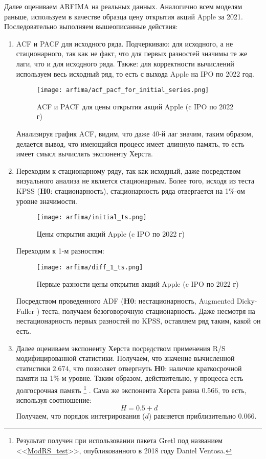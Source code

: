 \noindent Далее оцениваем ARFIMA на реальных данных. Аналогично всем моделям раньше, используем в качестве образца цену открытия акций Apple за 2021. Последовательно выполняем вышеописанные действия:
\begin{enumerate}
	\item ACF и PACF для исходного ряда. Подчеркиваю: для исходного, а не стационарного, так как не факт, что для первых разностей значимы те же лаги, что и для исходного ряда. Также: для корректности вычислений используем весь исходный ряд, то есть с выхода Apple на IPO по 2022 год.
	\begin{figure}[H]
		\centering
		\texttt{[image: arfima/acf\_pacf\_for\_initial\_series.png]}
		\caption{ACF и PACF для цены открытия акций Apple (c IPO по 2022 г)}
	\end{figure}
	Анализируя график ACF, видим, что даже 40-й лаг значим, таким образом, делается вывод, что имеющийся процесс имеет длинную память, то есть имеет смысл вычислять экспоненту Херста.
	
	\item Переходим к стационарному ряду, так как исходный, даже посредством визуального анализа не является стационарным. Более того, исходя из теста KPSS (\textbf{H0}: стационарность), стационарность ряда отвергается на 1\%-ом уровне значимости.
	\begin{figure}[H]
		\centering
		\texttt{[image: arfima/initial\_ts.png]}
		\caption{Цены открытия акций Apple (c IPO по 2022 г)}
	\end{figure}
	\noindent Переходим к 1-м разностям:
	\begin{figure}[H]
		\centering
		\texttt{[image: arfima/diff\_1\_ts.png]}
		\caption{Первые разности цены открытия акций Apple (c IPO по 2022 г)}
	\end{figure}
	\noindent Посредством проведенного ADF (\textbf{H0}: нестационарность, Augmented Dicky-Fuller \cite{adf_unit_root_test}) теста, получаем безоговорочную стационарность. Даже несмотря на нестационарность первых разностей по KPSS, оставляем ряд таким, какой он есть.
	
	\item Далее оцениваем экспоненту Херста посредством применения R/S модифицированной статистики. Получаем, что значение вычисленной статистики $2.674$, что позволяет отвергнуть \textbf{H0}: наличие краткосрочной памяти на 1\%-м уровне. Таким образом, действительно, у процесса есть долгосрочная память \footnote{Результат получен при использовании пакета Gretl под названием <<\href{https://gretl.sourceforge.net/cgi-bin/gretldata.cgi?opt=SHOW_FUNCS}{ModRS\_test}>>, опубликованного в 2018 году Daniel Ventosa.} . Сама же экспонента Херста равна $0.566$, то есть, используя соотношение:
	\begin{equation}
		H = 0.5 + d
	\end{equation}
	Получаем, что порядок интегрирования ($d$) равняется приблизительно $0.066$.
	

\end{enumerate}
